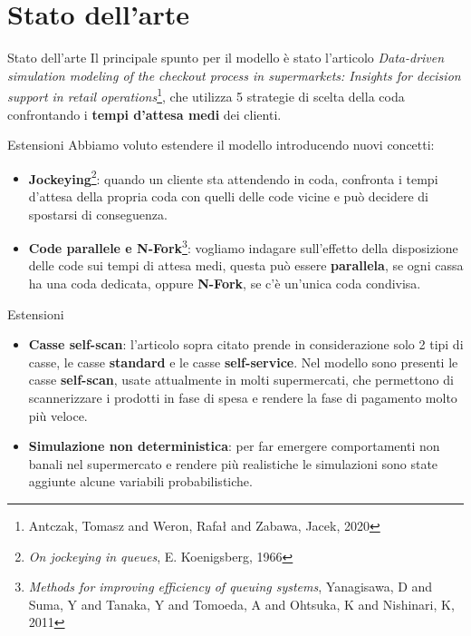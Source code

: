 \section{Stato dell'arte}
\begin{frame}{Stato dell'arte}
	Il principale spunto per il modello è stato l'articolo \textit{Data-driven simulation modeling of the checkout process in supermarkets: Insights for decision support in retail operations}\footnote{Antczak, Tomasz and Weron, Rafał and Zabawa, Jacek, 2020}, che utilizza 5 strategie di scelta della coda confrontando i \textbf{tempi d'attesa medi} dei clienti.
\end{frame}

\begin{frame}{Estensioni}
	Abbiamo voluto estendere il modello introducendo nuovi concetti:
	
	\begin{itemize}
		\item \textbf{Jockeying}\footnote{\textit{On jockeying in queues}, E. Koenigsberg, 1966}: quando un cliente sta attendendo in coda, confronta i tempi d'attesa della propria coda con quelli delle code vicine e può decidere di spostarsi di conseguenza.
		\item \textbf{Code parallele e N-Fork}\footnote{\textit{Methods for improving efficiency of queuing systems}, Yanagisawa, D and Suma, Y and Tanaka, Y and Tomoeda, A and Ohtsuka, K and Nishinari, K, 2011}: vogliamo indagare sull'effetto della disposizione delle code sui tempi di attesa medi, questa può essere \textbf{parallela}, se ogni cassa ha una coda dedicata, oppure \textbf{N-Fork}, se c'è un'unica coda condivisa.
	\end{itemize}
\end{frame}

\begin{frame}{Estensioni}
	\begin{itemize}
		\item \textbf{Casse self-scan}: l'articolo sopra citato prende in considerazione solo 2 tipi di casse, le casse \textbf{standard} e le casse \textbf{self-service}. Nel modello sono presenti le casse \textbf{self-scan}, usate attualmente in molti supermercati, che permettono di scannerizzare i prodotti in fase di spesa e rendere la fase di pagamento molto più veloce.
		\item \textbf{Simulazione non deterministica}: per far emergere comportamenti non banali nel supermercato e rendere più realistiche le simulazioni sono state aggiunte alcune variabili probabilistiche.
	\end{itemize}
\end{frame}